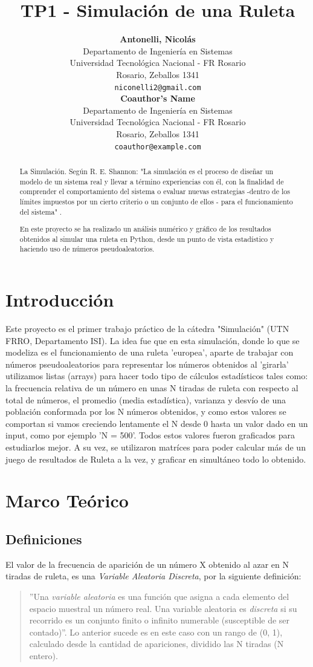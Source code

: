 \documentclass[a4paper]{article}
\title{\textbf{TP1 - Simulación de una Ruleta}}
\author{
    \textbf{Antonelli, Nicolás} \\
    Departamento de Ingeniería en Sistemas \\
    Universidad Tecnológica Nacional - FR Rosario \\
    Rosario, Zeballos 1341 \\
    \texttt{niconelli2@gmail.com} \\
  \And
    \textbf{Coauthor's Name} \\
    Departamento de Ingeniería en Sistemas \\
    Universidad Tecnológica Nacional - FR Rosario \\
    Rosario, Zeballos 1341 \\
    \texttt{coauthor@example.com} \\
    \small \date{}
}
\begin{document}
\maketitle
\begin{abstract}
La Simulación. Según R. E. Shannon: "La simulación es el proceso de diseñar un modelo de un sistema real y llevar a término experiencias con él, con la finalidad de comprender el comportamiento del sistema o evaluar nuevas estrategias -dentro de los límites impuestos por un cierto criterio o un conjunto de ellos - para el funcionamiento del sistema" \cite{simulacion_wiki}.

En este proyecto se ha realizado un análisis numérico y gráfico de los resultados obtenidos al simular una ruleta en Python, desde un punto de vista estadístico y haciendo uso de números pseudoaleatorios.
\end{abstract}


\section{Introducción}
Este proyecto es el primer trabajo práctico de la cátedra "Simulación" (UTN FRRO, Departamento ISI). La idea fue que en esta simulación, donde lo que se modeliza es el funcionamiento de una ruleta 'europea'\cite{ruleta_wiki}, aparte de trabajar con números pseudoaleatorios para representar los números obtenidos al 'girarla' utilizamos listas (arrays) para hacer todo tipo de cálculos estadísticos tales como: la frecuencia relativa de un número en unas N tiradas de ruleta con respecto al total de números, el promedio (media estadística), varianza y desvío de una población conformada por los N números obtenidos, y como estos valores se comportan si vamos creciendo lentamente el N desde 0 hasta un valor dado en un input, como por ejemplo 'N = 500'. Todos estos valores fueron graficados para estudiarlos mejor. A su vez, se utilizaron matríces para poder calcular más de un juego de resultados de Ruleta a la vez, y graficar en simultáneo todo lo obtenido.


\section{Marco Teórico}
\label{sec:marco}
\subsection{Definiciones}
\label{sec:definiciones}
El valor de la frecuencia de aparición de un número X obtenido al azar en N tiradas de ruleta, es una \textit{Variable Aleatoria Discreta}, por la siguiente definición\cite{prob_est}:
\begin{quote}
''Una \textit{variable aleatoria} es una función que asigna a cada elemento del espacio muestral un número real. Una variable aleatoria es \textit{discreta} si su recorrido es un conjunto finito o infinito numerable (susceptible de ser contado)''. Lo anterior sucede es en este caso con un rango de (0, 1), calculado desde la cantidad de apariciones, dividido las N tiradas (N entero).
\end{quote}
\end{document}
